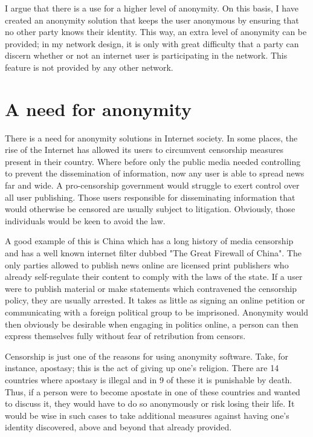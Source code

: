 \documentclass[ %
                    author={Luke Murray},
                supervisor={Dr. Simon Hollis},
                     title={Shadow Peer-to-Peer Networks},
                  subtitle={},
                    degree={MEng},
                      year={2013} ]{thesis}
\begin{document}
I argue that there is a use for a higher level of anonymity. On this basis, I have created an anonymity solution that keeps the user anonymous by ensuring that no other party knows their identity. This way, an extra level of anonymity can be provided; in my network design, it is only with great difficulty that a party can discern whether or not an internet user is participating in the network. This feature is not provided by any other network.


\section{A need for anonymity}

There is a need for anonymity solutions in Internet society. In some places, the rise of the Internet has allowed its users to circumvent censorship measures present in their country. Where before only the public media needed controlling to prevent the dissemination of information, now any user is able to spread news far and wide. A pro-censorship government would struggle to exert control over all user publishing. Those users responsible for disseminating information that would otherwise be censored are usually subject to litigation. Obviously, those individuals would be keen to avoid the law.

A good example of this is China which has a long history of media censorship and has a well known internet filter dubbed "The Great Firewall of China". The only parties allowed to publish news online are licensed print publishers who already self-regulate their content to comply with the laws of the state. If a user were to publish material or make statements which contravened the censorship policy, they are usually arrested. It takes as little as signing an online petition or communicating with a foreign political group to be imprisoned. Anonymity would then obviously be desirable when engaging in politics online, a person can then express themselves fully without fear of retribution from censors.

Censorship is just one of the reasons for using anonymity software. Take, for instance, apostasy; this is the act of giving up one's religion. There are 14 countries where apostasy is illegal and in 9 of these it is punishable by death. Thus, if a person were to become apostate in one of these countries and wanted to discuss it, they would have to do so anonymously or risk losing their life. It would be wise in such cases to take additional measures against having one's identity discovered, above and beyond that already provided.
\end{document}
